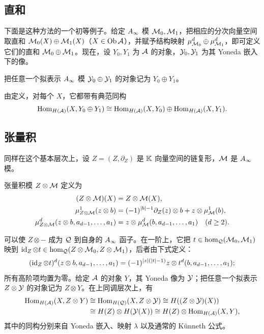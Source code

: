 \subsection{直和}\label{sec:3b}
下面是这种方法的一个初等例子。给定 $A_\infty$ 模 $\mathcal M_0,\mathcal M_1$，把相应的分次向量空间取直和 $\mathcal M_0(X)\oplus\mathcal M_1(X)$（$X\in\operatorname{Ob}\mathcal A$），并赋予结构映射 $\mu^d_{\mathcal M_0}\oplus\mu^d_{\mathcal M_1}$，即可定义它们的直和 $\mathcal M_0\oplus\mathcal M_1$。现在，设 $Y_0,Y_1$ 为 $\mathcal A$ 的对象，$\mathcal Y_0,\mathcal Y_1$
为其 Yoneda 嵌入下的像。
\begin{definition*}
把任意一个拟表示 $A_\infty$ 模 $\mathcal Y_0\oplus\mathcal Y_1$ 的对象记为 $Y_0\oplus Y_1$。
\end{definition*}
由定义，对每个 $X$，它都带有典范同构
\[
\operatorname{Hom}_{H(\mathcal A)}(X,Y_0\oplus Y_1)\cong\operatorname{Hom}_{H(\mathcal A)}(X,Y_0)\oplus\operatorname{Hom}_{H(\mathcal A)}(X,Y_1).
\]

\subsection{张量积}\label{sec:3c}
同样在这个基本层次上，设 $Z=(Z,\partial_Z)$ 是 $\mathbb K$ 向量空间的链复形，$\mathcal M$ 是 $A_\infty$ 模。
\begin{definition*}
张量积模 $Z\otimes\mathcal M$ 定义为
\begin{equation}\label{eq:3.2}
\begin{aligned}
(Z\otimes\mathcal M)(X)&=Z\otimes\mathcal M(X),\\
\mu^1_{Z\otimes\mathcal M}(z\otimes b)&=(-1)^{|b|-1}\partial_Z(z)\otimes b+z\otimes\mu^1_{\mathcal M}(b),\\
\mu^d_{Z\otimes\mathcal M}(z\otimes b,a_{d-1},\ldots,a_1)&=z\otimes\mu^d_{\mathcal M}(b,a_{d-1},\ldots,a_1)\quad(d\geq2).
\end{aligned}
\end{equation}

\end{definition*}
可以使 $Z\otimes-$ 成为 $\mathcal Q$ 到自身的 $A_\infty$ 函子。在一阶上，它把 $t\in\hom_{\mathcal Q}(\mathcal M_0,\mathcal M_1)$ 映到 $\operatorname{id}_Z\otimes t\in\hom_{\mathcal Q}(Z\otimes\mathcal M_0,Z\otimes\mathcal M_1)$，后者由下式定义：
\[
(\operatorname{id}_Z\otimes t)^d(z\otimes b,a_{d-1},\ldots,a_1)=(-1)^{|z|(|t|-1)}z\otimes t^d(b,a_{d-1},\ldots,a_1);
\]
所有高阶项均置为零。给定 $\mathcal A$ 的对象 $Y$，其 Yoneda 像为 $\mathcal Y$；把任意一个拟表示 $Z\otimes\mathcal Y$ 的对象记为 $Z\otimes Y$。在上同调层次上，有
\[
\begin{aligned}
\operatorname{Hom}_{H(\mathcal A)}(X,Z\otimes Y)&\cong\operatorname{Hom}_{H(\mathcal Q)}(X,Z\otimes\mathcal Y)\cong H((Z\otimes\mathcal Y)(X))\\
&\cong H(Z)\otimes H(\mathcal Y(X))\cong H(Z)\otimes\operatorname{Hom}_{H(\mathcal A)}(X,Y),
\end{aligned}
\]
其中的同构分别来自 Yoneda 嵌入、映射 $\lambda$ 以及通常的 Künneth 公式。

